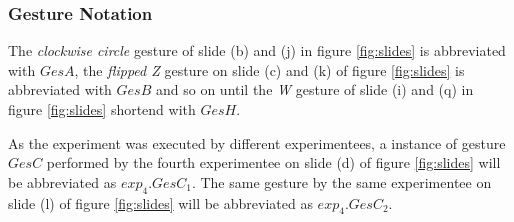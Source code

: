 \subsubsection{Gesture Notation} \label{gesture_notation}
The \textit{clockwise circle} gesture of slide (b) and (j) in figure \ref{fig:slides} is abbreviated with $GesA$, the
\textit{flipped Z} gesture on slide (c) and (k) of figure \ref{fig:slides} is abbreviated with $GesB$ and so on until
the \textit{W} gesture of slide (i) and (q) in figure \ref{fig:slides} shortend with $GesH$.

As the experiment was executed by different experimentees, a instance of gesture $GesC$ performed by the fourth
experimentee on slide (d) of figure \ref{fig:slides} will be abbreviated as $exp_{4}.GesC_{1}$. The same gesture by the
same experimentee on slide (l) of figure \ref{fig:slides} will be abbreviated as $exp_{4}.GesC_{2}$.
